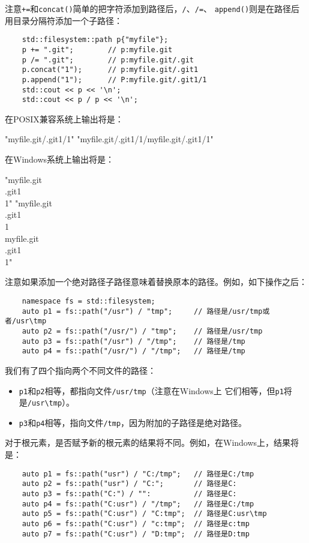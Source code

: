 注意\texttt{+=}和\texttt{concat()}简单的把字符添加到路径后，\texttt{/}、\texttt{/=}、
\texttt{append()}则是在路径后用目录分隔符添加一个子路径：
\begin{lstlisting}
    std::filesystem::path p{"myfile"};
    p += ".git";        // p:myfile.git
    p /= ".git";        // p:myfile.git/.git
    p.concat("1");      // p:myfile.git/.git1
    p.append("1");      // P:myfile.git/.git1/1
    std::cout << p << '\n';
    std::cout << p / p << '\n';
\end{lstlisting}
在POSIX兼容系统上输出将是：
\begin{blacklisting}
    "myfile.git/.git1/1"
    "myfile.git/.git1/1/myfile.git/.git1/1"
\end{blacklisting}
在Windows系统上输出将是：
\begin{blacklisting}
    "myfile.git\\.git1\\1"
    "myfile.git\\.git1\\1\\myfile.git\\.git1\\1"
\end{blacklisting}
注意如果添加一个绝对路径子路径意味着替换原本的路径。例如，如下操作之后：
\begin{lstlisting}
    namespace fs = std::filesystem;
    auto p1 = fs::path("/usr") / "tmp";     // 路径是/usr/tmp或者/usr\tmp
    auto p2 = fs::path("/usr/") / "tmp";    // 路径是/usr/tmp
    auto p3 = fs::path("/usr") / "/tmp";    // 路径是/tmp
    auto p4 = fs::path("/usr/") / "/tmp";   // 路径是/tmp
\end{lstlisting}
我们有了四个指向两个不同文件的路径：
\begin{itemize}
    \item \texttt{p1}和\texttt{p2}相等，都指向文件\texttt{/usr/tmp}（注意在Windows上
    它们相等，但\texttt{p1}将是\texttt{/usr\textbackslash tmp}）。
    \item \texttt{p3}和\texttt{p4}相等，指向文件\texttt{/tmp}，因为附加的子路径是绝对路径。
\end{itemize}
对于根元素，是否赋予新的根元素的结果将不同。例如，在Windows上，结果将是：
\begin{lstlisting}
    auto p1 = fs::path("usr") / "C:/tmp";   // 路径是C:/tmp
    auto p2 = fs::path("usr") / "C:";       // 路径是C:
    auto p3 = fs::path("C:") / "":          // 路径是C:
    auto p4 = fs::path("C:usr") / "/tmp";   // 路径是C:/tmp
    auto p5 = fs::path("C:usr") / "C:tmp";  // 路径是C:usr\tmp
    auto p6 = fs::path("C:usr") / "c:tmp";  // 路径是c:tmp
    auto p7 = fs::path("C:usr") / "D:tmp";  // 路径是D:tmp
\end{lstlisting}
